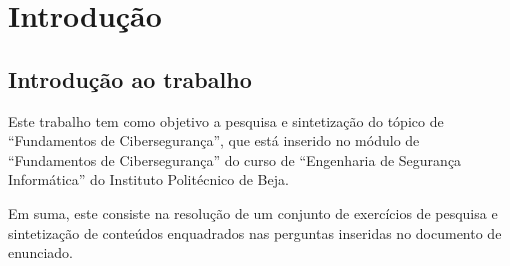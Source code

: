 \chapter{Introdução}

\section{Introdução ao trabalho}

Este trabalho tem como objetivo a pesquisa e sintetização do tópico de ``Fundamentos de Cibersegurança'', que está inserido no módulo de ``Fundamentos de Cibersegurança'' do curso de ``Engenharia de Segurança Informática'' do Instituto Politécnico de Beja.

Em suma, este consiste na resolução de um conjunto de exercícios de pesquisa e sintetização de conteúdos enquadrados nas perguntas inseridas no documento de enunciado.

\newpage
